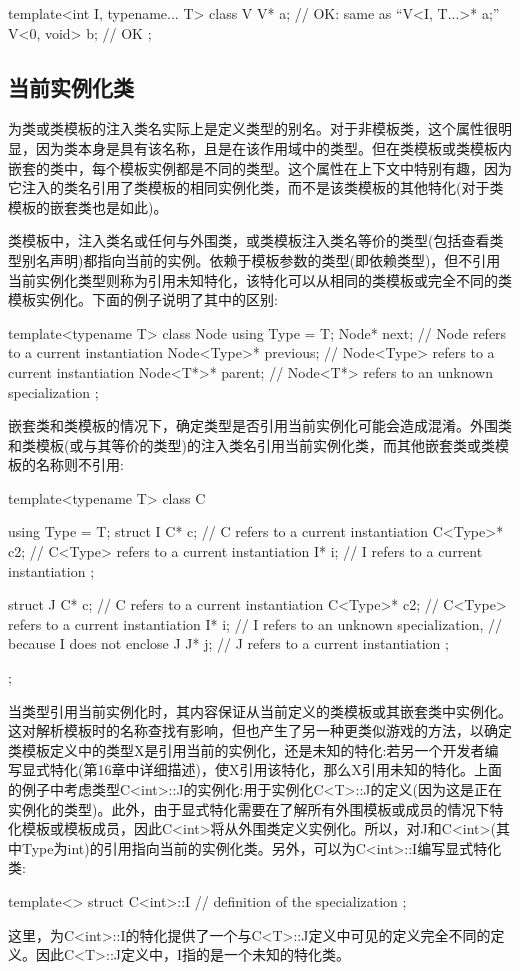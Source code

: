 \begin{cpp}
template<int I, typename... T> class V {
	V* a; // OK: same as “V<I, T...>* a;”
	V<0, void> b; // OK
};
\end{cpp}

\subsection{当前实例化类}

为类或类模板的注入类名实际上是定义类型的别名。对于非模板类，这个属性很明显，因为类本身是具有该名称，且是在该作用域中的类型。但在类模板或类模板内嵌套的类中，每个模板实例都是不同的类型。这个属性在上下文中特别有趣，因为它注入的类名引用了类模板的相同实例化类，而不是该类模板的其他特化(对于类模板的嵌套类也是如此)。

类模板中，注入类名或任何与外围类，或类模板注入类名等价的类型(包括查看类型别名声明)都指向当前的实例。依赖于模板参数的类型(即依赖类型)，但不引用当前实例化类型则称为引用未知特化，该特化可以从相同的类模板或完全不同的类模板实例化。下面的例子说明了其中的区别:

\begin{cpp}
template<typename T> class Node {
	using Type = T;
	Node* next; // Node refers to a current instantiation
	Node<Type>* previous; // Node<Type> refers to a current instantiation
	Node<T*>* parent; // Node<T*> refers to an unknown specialization
};
\end{cpp}

嵌套类和类模板的情况下，确定类型是否引用当前实例化可能会造成混淆。外围类和类模板(或与其等价的类型)的注入类名引用当前实例化类，而其他嵌套类或类模板的名称则不引用:

\begin{cpp}
template<typename T> class C {
	using Type = T;
	struct I {
		C* c; // C refers to a current instantiation
		C<Type>* c2; // C<Type> refers to a current instantiation
		I* i; // I refers to a current instantiation
	};

	struct J {
		C* c; // C refers to a current instantiation
		C<Type>* c2; // C<Type> refers to a current instantiation
		I* i; // I refers to an unknown specialization,
			  // because I does not enclose J
		J* j; // J refers to a current instantiation
	};
};
\end{cpp}

当类型引用当前实例化时，其内容保证从当前定义的类模板或其嵌套类中实例化。这对解析模板时的名称查找有影响，但也产生了另一种更类似游戏的方法，以确定类模板定义中的类型X是引用当前的实例化，还是未知的特化:若另一个开发者编写显式特化(第16章中详细描述)，使X引用该特化，那么X引用未知的特化。上面的例子中考虑类型C<int>::J的实例化:用于实例化C<T>::J的定义(因为这是正在实例化的类型)。此外，由于显式特化需要在了解所有外围模板或成员的情况下特化模板或模板成员，因此C<int>将从外围类定义实例化。所以，对J和C<int>(其中Type为int)的引用指向当前的实例化类。另外，可以为C<int>::I编写显式特化类:

\begin{cpp}
template<> struct C<int>::I {
	// definition of the specialization
};
\end{cpp}

这里，为C<int>::I的特化提供了一个与C<T>::J定义中可见的定义完全不同的定义。因此C<T>::J定义中，I指的是一个未知的特化类。


